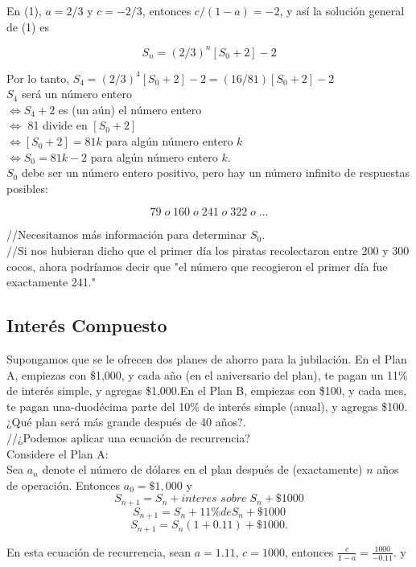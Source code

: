 \documentclass{article}
\begin{document}
En (1), $a=2/3$ y $c=-2/3$, entonces $c/(1-a) = -2$, y así la solución general de (1) es

$$
S_{n}= (2/3)^{n}[S_0 + 2] -2
$$

Por lo tanto, $S_{4} = (2/3)^{4}[S_0+2]-2 = (16/81)[S_0 + 2]-2$ \\

$S_4$ será un número entero\\
$\Leftrightarrow S_{4} + 2$ es (un aún) el número entero\\
$\Leftrightarrow$ 81 divide en $[S_0 + 2]$\\
$\Leftrightarrow [S_0 + 2] = 81k$ para algún número entero $k$\\
$\Leftrightarrow S_0 = 81k - 2$ para algún número entero $k$.\\

$S_{0}$ debe ser un número entero positivo, pero hay un número infinito de respuestas posibles:

$$79\; o \;160 \; o \; 241\; o \; 322 \; o\; ...$$

//Necesitamos más información para determinar $S_0$.\\

//Si nos hubieran dicho que el primer día los piratas recolectaron entre 200 y 300 cocos, ahora podríamos decir que "el número que recogieron el primer día fue exactamente 241."


\subsection{Interés Compuesto}

Supongamos que se le ofrecen dos planes de ahorro para la jubilación. En el Plan A, empiezas con \$1,000, y cada año (en el aniversario del plan), te pagan un 11\% de interés simple, y agregas \$1,000.En el Plan B, empiezas con \$100, y cada mes, te pagan una-duodécima parte del 10\% de interés simple (anual), y agregas \$100.¿Qué plan será más grande después de 40 años?.\\
//¿Podemos aplicar una ecuación de recurrencia?\\
Considere el Plan A:\\
Sea $a_n$ denote el número de dólares en el plan después de (exactamente) $n$ años de operación. Entonces 
$a_0 = \$1,000$ y
$$S_{n+1} = S_{n} + \textit{interes sobre}\; S_n + \$1000$$
$$S_{n+1} = S_{n} + 11\% \textit{de} S_n + \$1000$$
$$S_{n+1} = S_{n}(1+0.11) + \$1000.$$

En esta ecuación de recurrencia, sean $a=1.11$, $c=1000$, entonces $\frac{c}{1-a}=\frac{1000}{-0.11}$. y 
\end{document}
